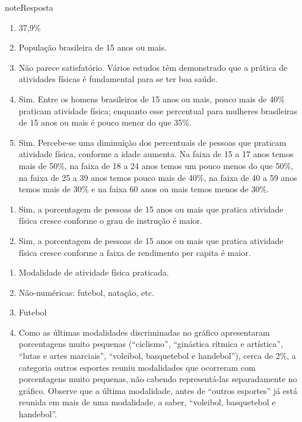\begin{sphinxadmonition}{note}{Resposta}

\begin{enumerate}
\item {} 
37,9\%

\item {} 
População brasileira de 15 anos ou mais.

\item {} 
Não parece satisfatório. Vários estudos têm demonstrado que a prática de atividades físicas é fundamental para se ter boa saúde.

\item {} 
Sim. Entre os homens brasileiros de 15 anos ou mais, pouco mais de 40\% praticam atividade física; enquanto esse percentual para mulheres brasileiras de 15 anos ou mais é pouco menor do que 35\%.

\item {} 
Sim. Percebe-se uma diminuição dos percentuais de pessoas que praticam atividade física, conforme a idade aumenta. Na faixa de 15 a 17 anos temos mais de 50\%, na faixa de 18 a 24 anos temos um pouco menos do que 50\%, na faixa de 25 a 39 anos temos pouco mais de 40\%, na faixa de 40 a 59 anos temos mais de 30\% e na faixa 60 anos ou mais temos menos de 30\%.

\end{enumerate}

\begin{enumerate}
\item {} 
Sim, a porcentagem de pessoas de 15 anos ou mais que pratica atividade física cresce conforme o grau de instrução é maior.

\item {} 
Sim, a porcentagem de pessoas de 15 anos ou mais que pratica atividade física cresce conforme a faixa de rendimento per capita é maior.

\end{enumerate}

\begin{enumerate}
\item {} 
Modalidade de atividade física praticada.

\item {} 
Não-numéricas: futebol, natação, etc.

\item {} 
Futebol

\item {} 
Como as últimas modalidades discriminadas no gráfico apresentaram porcentagens muito pequenas (``ciclismo'', ``ginástica rítmica e artística'', ``lutas e artes marciais'', ``voleibol, basquetebol e handebol''), cerca de 2\%, a categoria outros esportes reuniu modalidades que ocorreram com porcentagens muito pequenas, não cabendo representá-las separadamente no gráfico. Observe que a última modalidade, antes de ``outros esportes'' já está reunida em mais de uma modalidade, a saber, ``voleibol, basquetebol e handebol''.


\end{enumerate}
\end{sphinxadmonition}
